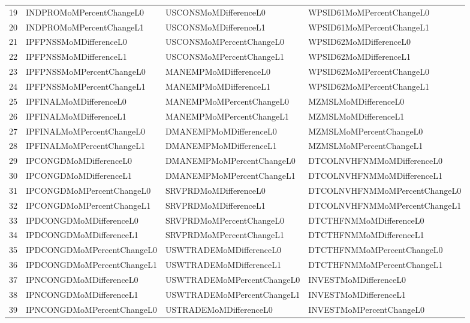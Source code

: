\begin{longtable}{rlll}
  19 & INDPROMoMPercentChangeL0 & USCONSMoMDifferenceL0 & WPSID61MoMPercentChangeL0 \\ 
  20 & INDPROMoMPercentChangeL1 & USCONSMoMDifferenceL1 & WPSID61MoMPercentChangeL1 \\ 
  21 & IPFPNSSMoMDifferenceL0 & USCONSMoMPercentChangeL0 & WPSID62MoMDifferenceL0 \\ 
  22 & IPFPNSSMoMDifferenceL1 & USCONSMoMPercentChangeL1 & WPSID62MoMDifferenceL1 \\ 
  23 & IPFPNSSMoMPercentChangeL0 & MANEMPMoMDifferenceL0 & WPSID62MoMPercentChangeL0 \\ 
  24 & IPFPNSSMoMPercentChangeL1 & MANEMPMoMDifferenceL1 & WPSID62MoMPercentChangeL1 \\ 
  25 & IPFINALMoMDifferenceL0 & MANEMPMoMPercentChangeL0 & MZMSLMoMDifferenceL0 \\ 
  26 & IPFINALMoMDifferenceL1 & MANEMPMoMPercentChangeL1 & MZMSLMoMDifferenceL1 \\ 
  27 & IPFINALMoMPercentChangeL0 & DMANEMPMoMDifferenceL0 & MZMSLMoMPercentChangeL0 \\ 
  28 & IPFINALMoMPercentChangeL1 & DMANEMPMoMDifferenceL1 & MZMSLMoMPercentChangeL1 \\ 
  29 & IPCONGDMoMDifferenceL0 & DMANEMPMoMPercentChangeL0 & DTCOLNVHFNMMoMDifferenceL0 \\ 
  30 & IPCONGDMoMDifferenceL1 & DMANEMPMoMPercentChangeL1 & DTCOLNVHFNMMoMDifferenceL1 \\ 
  31 & IPCONGDMoMPercentChangeL0 & SRVPRDMoMDifferenceL0 & DTCOLNVHFNMMoMPercentChangeL0 \\ 
  32 & IPCONGDMoMPercentChangeL1 & SRVPRDMoMDifferenceL1 & DTCOLNVHFNMMoMPercentChangeL1 \\ 
  33 & IPDCONGDMoMDifferenceL0 & SRVPRDMoMPercentChangeL0 & DTCTHFNMMoMDifferenceL0 \\ 
  34 & IPDCONGDMoMDifferenceL1 & SRVPRDMoMPercentChangeL1 & DTCTHFNMMoMDifferenceL1 \\ 
  35 & IPDCONGDMoMPercentChangeL0 & USWTRADEMoMDifferenceL0 & DTCTHFNMMoMPercentChangeL0 \\ 
  36 & IPDCONGDMoMPercentChangeL1 & USWTRADEMoMDifferenceL1 & DTCTHFNMMoMPercentChangeL1 \\ 
  37 & IPNCONGDMoMDifferenceL0 & USWTRADEMoMPercentChangeL0 & INVESTMoMDifferenceL0 \\ 
  38 & IPNCONGDMoMDifferenceL1 & USWTRADEMoMPercentChangeL1 & INVESTMoMDifferenceL1 \\ 
  39 & IPNCONGDMoMPercentChangeL0 & USTRADEMoMDifferenceL0 & INVESTMoMPercentChangeL0 \\ 

\end{longtable}
